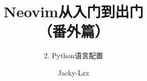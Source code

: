 \documentclass[17pt]{ctexbeamer}
\title{Neovim从入门到出门\\（番外篇）}
\subtitle{2. Python语言配置}
\author{Jacky-Lzx}
\date{}
\begin{document}
\begin{frame}
  \titlepage
\end{frame}
\end{document}
